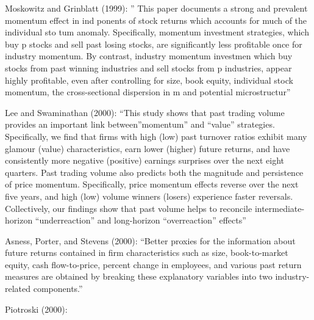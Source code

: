 \documentclass[
  letterpaper,
  DIV=11,
  numbers=noendperiod]{scrreprt}
\begin{document}
Moskowitz and Grinblatt (1999): '' This paper documents a strong and
prevalent momentum effect in ind ponents of stock returns which accounts
for much of the individual sto tum anomaly. Specifically, momentum
investment strategies, which buy p stocks and sell past losing stocks,
are significantly less profitable once for industry momentum. By
contrast, industry momentum investmen which buy stocks from past winning
industries and sell stocks from p industries, appear highly profitable,
even after controlling for size, book equity, individual stock momentum,
the cross-sectional dispersion in m and potential microstructur''

Lee and Swaminathan (2000): ``This study shows that past trading volume
provides an important link between''momentum'' and ``value'' strategies.
Specifically, we find that firms with high (low) past turnover ratios
exhibit many glamour (value) characteristics, earn lower (higher) future
returns, and have consistently more negative (positive) earnings
surprises over the next eight quarters. Past trading volume also
predicts both the magnitude and persistence of price momentum.
Specifically, price momentum effects reverse over the next five years,
and high (low) volume winners (losers) experience faster reversals.
Collectively, our findings show that past volume helps to reconcile
intermediate-horizon ``underreaction'' and long-horizon ``overreaction''
effects''

Asness, Porter, and Stevens (2000): ``Better proxies for the information
about future returns contained in firm characteristics such as size,
book-to-market equity, cash flow-to-price, percent change in employees,
and various past return measures are obtained by breaking these
explanatory variables into two industry-related components.''

Piotroski (2000):
\end{document}
